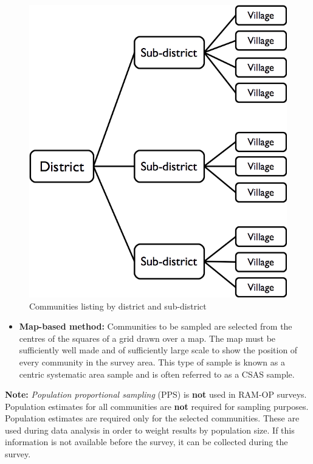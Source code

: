 \documentclass[12pt,a4paper]{book}
\providecommand{\tightlist}{%
  \setlength{\itemsep}{0pt}\setlength{\parskip}{0pt}}
\theoremstyle{definition}
\theoremstyle{definition}
\theoremstyle{definition}
\theoremstyle{remark}
\begin{document}
\begin{figure}[H]

{\centering \includegraphics[width=8.38in]{figures/listSample1} 

}

\caption{Communities listing by district and sub-district}\label{fig:sample1}
\end{figure}

\begin{itemize}
\tightlist
\item
  \textbf{Map-based method:} Communities to be sampled are selected from
  the centres of the squares of a grid drawn over a map. The map must be
  sufficiently well made and of sufficiently large scale to show the
  position of every community in the survey area. This type of sample is
  known as a centric systematic area sample and is often referred to as
  a CSAS sample.
\end{itemize}

\textbf{Note:} \emph{Population proportional sampling} (PPS) is
\textbf{not} used in RAM-OP surveys. Population estimates for all
communities are \textbf{not} required for sampling purposes. Population
estimates are required only for the selected communities. These are used
during data analysis in order to weight results by population size. If
this information is not available before the survey, it can be collected
during the survey.
\end{document}

